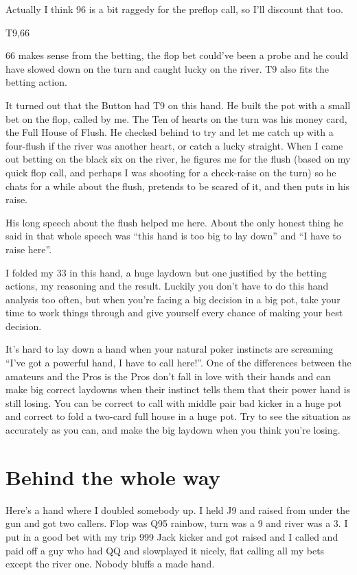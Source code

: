 Actually I think 96 is a bit raggedy for the preflop call, so I'll
discount that too.

T9,66

66 makes sense from the betting, the flop bet could've been a probe
and he could have slowed down on the turn and caught lucky on the river.
T9 also fits the betting action.

It turned out that the Button had T9 on this hand.
He built the pot with a small bet on the flop, called by me.
The Ten of hearts on the turn was his money card, the
Full House of Flush. He checked behind
to try and let me catch up with a four-flush if the river was
another heart, or catch a lucky straight.
When I came out betting on the black six on
the river, he figures me for the flush (based on my quick
flop call, and perhaps I was shooting for a check-raise on the turn)
so he chats for a while about the flush, pretends to be scared of it,
and then puts in his raise.

His long speech about the flush helped me here. About
the only honest thing he said in that whole speech was
``this hand is too big to lay down'' and ``I have to raise here''.

I folded my 33 in this hand, a huge laydown but one
justified by the betting actions, my reasoning and the result.
Luckily you don't have to do this hand analysis too often, but
when you're facing a big decision in a big pot, take your time to
work things through and give yourself every chance of making your best
decision.

It's hard to lay down a hand when your natural poker instincts are
screaming ``I've got a powerful hand, I have to call here!''. One of
the differences between the amateurs and the Pros is the Pros don't
fall in love with their hands and can make big correct laydowns when
their instinct tells them that their power hand is still losing.
You can be correct to call with middle pair bad kicker in a huge pot
and correct to fold a two-card full house in a huge pot. Try to see
the situation as accurately as you can, and make the big laydown when
you think you're losing.

\section{Behind the whole way}

Here's a hand where I doubled somebody up. I held J9 and raised from
under the gun and got two callers. Flop was
Q95 rainbow, turn was a 9 and river was a 3. I put in a good bet
with my trip 999 Jack kicker and got raised and I called and paid off
a guy who had QQ and slowplayed it nicely, flat calling all my bets
except the river one. Nobody bluffs a made hand.


